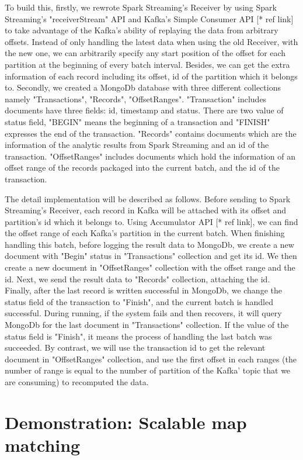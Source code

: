\documentclass{acm_proc_article-sp}
\begin{document}
To build this, firstly, we rewrote Spark Streaming's Receiver by using Spark Streaming's "receiverStream" API and Kafka's Simple Consumer API [* ref link] to take advantage of the Kafka's ability of replaying the data from arbitrary offsets.  Instead of only handling the latest data when using the old Receiver, with the new one, we can arbitrarily specify any start position of the offset for each partition at the beginning of every batch interval. Besides, we can get the extra information of each record including its offset, id of the partition which it belongs to.  Secondly, we created a MongoDb database with three different collections namely "Transactions", "Records", "OffsetRanges". "Transaction" includes documents have three fields: id, timestamp and status. There are two value of status field, "BEGIN" means the beginning of a transaction and "FINISH" expresses the end of the transaction. "Records" contains documents which are the information of the analytic results from Spark Streaming and an id of the transaction. "OffsetRanges" includes documents which hold the information of an offset range of the records packaged into the current batch, and the id of the transaction.

The detail implementation will be described as follows. Before sending to Spark Streaming's Receiver, each record in Kafka will be attached with its offset and partition's id which it belongs to. Using Accumulator API [* ref link], we can find the offset range of each Kafka's partition in the current batch. When finishing handling this batch, before logging the result data to MongoDb, we create a new document with "Begin" status in "Transactions" collection and get its id. We then create a new document in "OffsetRanges" collection with the offset range and the id. Next, we send the result data to "Records" collection, attaching the id. Finally, after the last record is written successful in MongoDb, we change the status field of the transaction to "Finish", and the current batch is handled successful. During running, if the system fails and then recovers, it will query MongoDb for the last document in "Transactions" collection.  If the value of the status field is "Finish", it means the process of handling the last batch was succeeded. By contrast, we will use the transaction id to get the relevant document in "OffsetRanges" collection, and use the first offset in each ranges (the number of range is equal to the number of partition of the Kafka' topic that we are consuming) to recomputed the data. 

\section{Demonstration: Scalable map matching}
\end{document}
